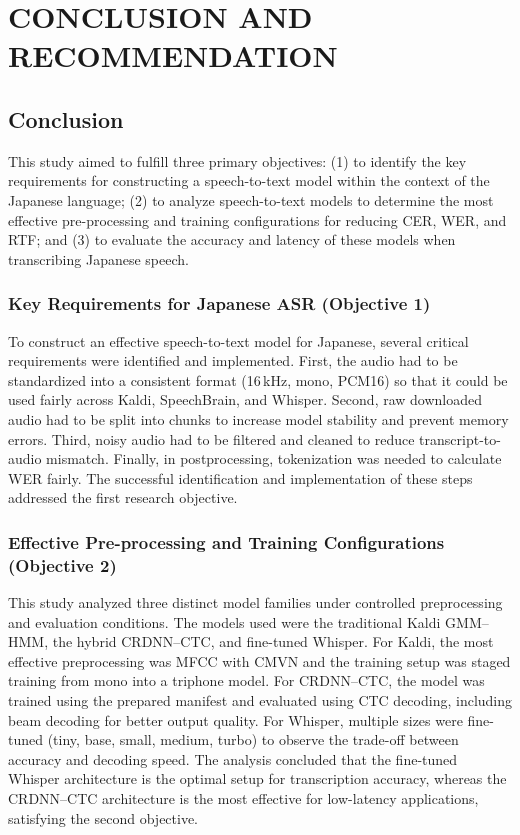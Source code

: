 \chapter{CONCLUSION AND RECOMMENDATION}
\label{ch:conclusion}

\section{Conclusion}
This study aimed to fulfill three primary objectives: (1) to identify the key requirements for constructing a speech-to-text model within the context of the Japanese language; (2) to analyze speech-to-text models to determine the most effective pre-processing and training configurations for reducing CER, WER, and RTF; and (3) to evaluate the accuracy and latency of these models when transcribing Japanese speech.

\subsection{Key Requirements for Japanese ASR (Objective 1)}
To construct an effective speech-to-text model for Japanese, several critical requirements were identified and implemented. First, the audio had to be standardized into a consistent format (16\,kHz, mono, PCM16) so that it could be used fairly across Kaldi, SpeechBrain, and Whisper. Second, raw downloaded audio had to be split into chunks to increase model stability and prevent memory errors. Third, noisy audio had to be filtered and cleaned to reduce transcript-to-audio mismatch. Finally, in postprocessing, tokenization was needed to calculate WER fairly. The successful identification and implementation of these steps addressed the first research objective.

\subsection{Effective Pre-processing and Training Configurations (Objective 2)}
This study analyzed three distinct model families under controlled preprocessing and evaluation conditions. The models used were the traditional Kaldi GMM--HMM, the hybrid CRDNN--CTC, and fine-tuned Whisper. For Kaldi, the most effective preprocessing was MFCC with CMVN and the training setup was staged training from mono into a triphone model. For CRDNN--CTC, the model was trained using the prepared manifest and evaluated using CTC decoding, including beam decoding for better output quality. For Whisper, multiple sizes were fine-tuned (tiny, base, small, medium, turbo) to observe the trade-off between accuracy and decoding speed. The analysis concluded that the fine-tuned Whisper architecture is the optimal setup for transcription accuracy, whereas the CRDNN--CTC architecture is the most effective for low-latency applications, satisfying the second objective.

